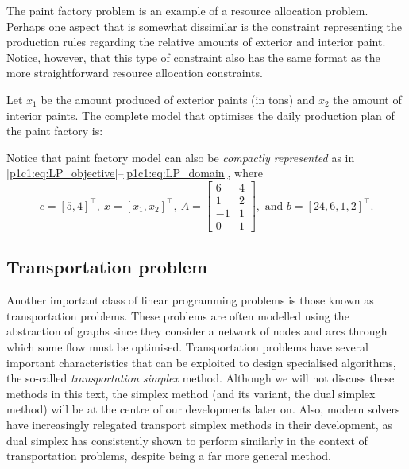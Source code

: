 The paint factory problem is an example of a resource allocation problem. Perhaps one aspect that is somewhat dissimilar is the constraint representing the production rules regarding the relative amounts of exterior and interior paint. Notice, however, that this type of constraint also has the same format as the more straightforward resource allocation constraints.  

Let $x_1$ be the amount produced of exterior paints (in tons) and $x_2$ the amount of interior paints. The complete model that optimises the daily production plan of the paint factory is:
%
%
Notice that paint factory model can also be \emph{compactly represented} as in \eqref{p1c1:eq:LP_objective}--\eqref{p1c1:eq:LP_domain}, where
%
\begin{equation*}
	c = [5, 4]^\top, \ x = [x_1, x_2]^\top, \ A = \begin{bmatrix} 6 & 4 \\ 1 & 2 \\ -1 & 1 \\0 & 1 \end{bmatrix}, \text{ and } b = [24, 6, 1, 2]^\top.	
\end{equation*}
%


\subsection{Transportation problem}

Another important class of linear programming problems is those known as transportation problems. These problems are often modelled using the abstraction of graphs since they consider a network of nodes and arcs through which some flow must be optimised. Transportation problems have several important characteristics that can be exploited to design specialised algorithms, the so-called \emph{transportation simplex} method. Although we will not discuss these methods in this text, the simplex method (and its variant, the dual simplex method) will be at the centre of our developments later on. Also, modern solvers have increasingly relegated transport simplex methods in their development, as dual simplex has consistently shown to perform similarly in the context of transportation problems, despite being a far more general method. 

